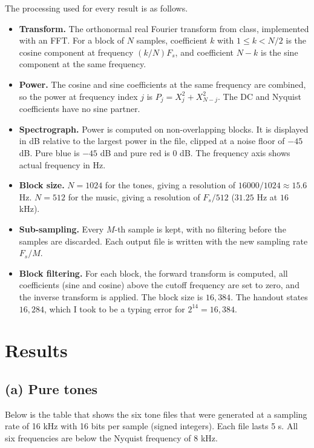 \documentclass[12pt, letterpaper]{article}
\begin{document}
The processing used for every result is as follows.
\begin{itemize}
  \item \textbf{Transform.} The orthonormal real Fourier transform from class, implemented with an FFT. For a block of $N$ samples, coefficient $k$ with $1 \le k < N/2$ is the cosine component at frequency $(k/N)F_s$, and coefficient $N-k$ is the sine component at the same frequency.
  \item \textbf{Power.} The cosine and sine coefficients at the same frequency are combined, so the power at frequency index $j$ is $P_j = X_j^2 + X_{N-j}^2$. The DC and Nyquist coefficients have no sine partner.
  \item \textbf{Spectrograph.} Power is computed on non-overlapping blocks. It is displayed in dB relative to the largest power in the file, clipped at a noise floor of $-45$ dB. Pure blue is $-45$ dB and pure red is $0$ dB. The frequency axis shows actual frequency in Hz.
  \item \textbf{Block size.} $N = 1024$ for the tones, giving a resolution of $16000/1024 \approx 15.6$ Hz. $N = 512$ for the music, giving a resolution of $F_s/512$ ($31.25$ Hz at $16$ kHz).
  \item \textbf{Sub-sampling.} Every $M$-th sample is kept, with no filtering before the samples are discarded. Each output file is written with the new sampling rate $F_s/M$.
  \item \textbf{Block filtering.} For each block, the forward transform is computed, all coefficients (sine and cosine) above the cutoff frequency are set to zero, and the inverse transform is applied. The block size is $16{,}384$. The handout states $16{,}284$, which I took to be a typing error for $2^{14} = 16{,}384$.
\end{itemize}

\section{Results}

\subsection{(a) Pure tones}

Below is the table that shows the six tone files that were generated at a sampling rate of 16 kHz with 16 bits per sample (signed integers). Each file lasts 5 s. All six frequencies are below the Nyquist frequency of 8 kHz.
\end{document}
